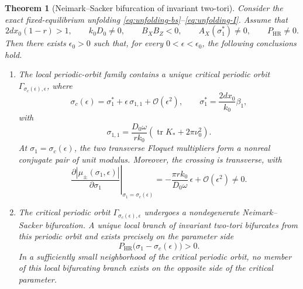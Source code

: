 \documentclass[11pt]{amsart}
\newtheorem{theorem}{Theorem}[section]
\theoremstyle{remark}
\newcommand{\cO}{\mathcal{O}}
\newcommand{\PHR}{P_{\mathrm{HR}}}
\begin{document}
\begin{theorem}[Neimark--Sacker bifurcation of invariant two-tori]
\label{thm:NS}
Consider the exact fixed-equilibrium unfolding
\eqref{eq:unfolding-bs}--\eqref{eq:unfolding-I}. Assume that
\begin{equation}
\label{eq:NS-hypotheses}
 2dx_0(1-r)>1,
 \qquad
 k_0D_0\ne0,
 \qquad
 B_XB_Z<0,
 \qquad
 A_X(\sigma_1^*)\ne0,
 \qquad
 \PHR\ne0.
\end{equation}
Then there exists $\epsilon_0>0$ such that, for every
$0<\epsilon<\epsilon_0$, the following conclusions hold.

\begin{enumerate}[label=\textup{(\arabic*)},leftmargin=2em]

\item
The local periodic-orbit family contains a unique critical periodic orbit
$\Gamma_{\sigma_c(\epsilon),\epsilon}$, where
\begin{equation}
\label{eq:sigma-critical}
 \sigma_c(\epsilon)
 =
 \sigma_1^*
 +
 \epsilon\,\sigma_{1,1}
 +
 \cO(\epsilon^2),
 \qquad
 \sigma_1^*
 =
 \frac{2dx_0}{k_0}\beta_1,
\end{equation}
with
\begin{equation}
\label{eq:sigma-first-correction-main}
 \sigma_{1,1}
 =
 \frac{D_0\omega}{rk_0}
 \left(
   \operatorname{tr}K_*+2\pi\nu_0^2
 \right).
\end{equation}
At $\sigma_1=\sigma_c(\epsilon)$, the two transverse Floquet
multipliers form a nonreal conjugate pair of unit modulus. Moreover, the
crossing is transverse, with
\begin{equation}
\label{eq:transverse-crossing-main}
 \left.
 \frac{\partial |\mu_\pm(\sigma_1,\epsilon)|}
 {\partial \sigma_1}
 \right|_{\sigma_1=\sigma_c(\epsilon)}
 =
 -\frac{\pi r k_0}{D_0\omega}\,\epsilon
 +
 \cO(\epsilon^2)
 \ne0.
\end{equation}

\item
The critical periodic orbit
$\Gamma_{\sigma_c(\epsilon),\epsilon}$ undergoes a nondegenerate
Neimark--Sacker bifurcation. A unique local branch of invariant two-tori
bifurcates from this periodic orbit and exists precisely on the parameter
side
\begin{equation}
\label{eq:torus-side}
 \PHR\bigl(\sigma_1-\sigma_c(\epsilon)\bigr)>0.
\end{equation}
In a sufficiently small neighborhood of the critical periodic orbit, no
member of this local bifurcating branch exists on the opposite side of the
critical parameter.


\end{enumerate}
\end{theorem}
\end{document}
